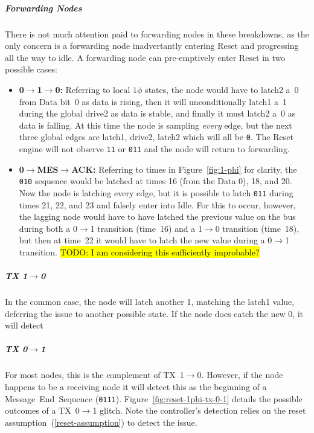 \subparagraph{Forwarding Nodes}
There is not much attention paid to forwarding nodes in these breakdowns, as
the only concern is a forwarding node inadvertantly entering Reset and
progressing all the way to idle. A forwarding node can pre-emptively enter
Reset in two possible cases:

\begin{itemize}
  \item {\bf 0$\rightarrow$1$\rightarrow$0:} Referring to local $1\phi$
states, the node would have to {\sc latch2} a~0 from Data bit~0 as data is
rising, then it will unconditionally {\sc latch1} a~1 during the global {\sc
drive2} as data is stable, and finally it must {\sc latch2} a~0 as data is
falling. At this time the node is sampling {\em every} edge, but the next
three global edges are {\sc latch1}, {\sc drive2}, {\sc latch2} which will all
be {\tt 0}. The Reset engine will not observe {\tt 11} or {\tt 011} and the
node will return to forwarding.

  \item {\bf 0$\rightarrow$MES$\rightarrow$ACK:} Referring to times in
Figure~\ref{fig:1-phi} for clarity, the {\tt 010} sequence would be latched at
times 16 (from the Data 0), 18, and 20. Now the node is latching every edge,
but it is possible to latch {\tt 011} during times 21, 22, and 23 and falsely
enter into Idle. For this to occur, however, the lagging node would have to
have latched the previous value on the bus during both a 0$\rightarrow$1
transition (time~16) and a 1$\rightarrow$0 transition (time~18), but then at
time~22 it would have to latch the new value during a 0$\rightarrow$1
transition. \hl{TODO: I am considering this sufficiently improbable?}
  \label{todo:varying-latches}
\end{itemize}

\subparagraph{TX 1$\rightarrow$0}
In the common case, the node will latch another 1, matching the {\sc latch1}
value, deferring the issue to another possible state. If the node does catch
the new 0, it will detect 

\subparagraph{TX 0$\rightarrow$1}
\label{reset-phi1-tx-0-1}
For most nodes, this is the complement of TX~1$\rightarrow$0. However, if the
node happens to be a receiving node it will detect this as the beginning of a
Message~End~Sequence ({\tt 0111}). Figure~\ref{fig:reset-1phi-tx-0-1} details
the possible outcomes of a TX~0$\rightarrow$1 glitch.  Note the controller's
detection relies on the reset assumption~(\ref{reset-assumption}) to detect
the issue.

